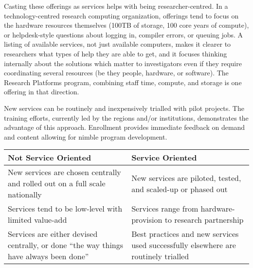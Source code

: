 \documentclass[11pt, letterpaper, twoside]{article}
\begin{document}
Casting these offerings as services helps with being researcher-centred.
In a technology-centred research computing organization, offerings tend
to focus on the hardware resources themselves (100TB of storage, 100
core years of compute), or helpdesk-style questions about logging in,
compiler errors, or queuing jobs. A listing of available services, not
just available computers, makes it clearer to researchers what types of
help they are able to get, and it focuses thinking internally about the
solutions which matter to investigators even if they require
coordinating several resources (be they people, hardware, or software).
The Research Platforms program, combining staff time, compute, and
storage is one offering in that direction.


New services can be routinely and inexpensively trialled with pilot
projects.  The training efforts, currently led by the regions and/or
institutions, demonstrates the advantage of this approach. Enrollment
provides immediate feedback on demand and content allowing for nimble
program development.

\begin{table}[ht]
\centering
\small {\sffamily
{}
\begin{tabular}{P{2.5in}|P{2.5in}}
\textcolor{cdaRed}{\textbf{Not Service Oriented}} & \textcolor{cdaRed}{\textbf{Service Oriented}} \\
\hline \hline 
New services are chosen centrally and rolled out on a full scale nationally & New services are piloted, tested, and scaled-up or phased out\\
Services tend to be low-level with limited value-add & Services range from hardware-provision to research partnership\\
Services are either devised centrally, or done \enquote{the way things have always been done} & Best practices and new services used successfully elsewhere are routinely trialled \\
\hline
\end{tabular}
}
\end{table}
\end{document}
